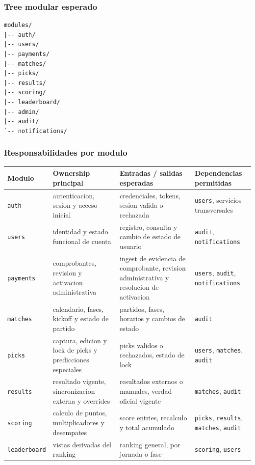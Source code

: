 \subsubsection{Tree modular esperado}

\begin{verbatim}
modules/
|-- auth/
|-- users/
|-- payments/
|-- matches/
|-- picks/
|-- results/
|-- scoring/
|-- leaderboard/
|-- admin/
|-- audit/
`-- notifications/
\end{verbatim}

\subsubsection{Responsabilidades por modulo}

\begin{longtable}{p{}p{}p{}p{}}
\toprule
\textbf{Modulo} & \textbf{Ownership principal} & \textbf{Entradas / salidas esperadas} & \textbf{Dependencias permitidas} \\
\midrule
\texttt{auth} & autenticacion, sesion y acceso inicial & credenciales, tokens, sesion valida o rechazada & \texttt{users}, servicios transversales \\
\texttt{users} & identidad y estado funcional de cuenta & registro, consulta y cambio de estado de usuario & \texttt{audit}, \texttt{notifications} \\
\texttt{payments} & comprobantes, revision y activacion administrativa & ingest de evidencia de comprobante, revision administrativa y resolucion de activacion & \texttt{users}, \texttt{audit}, \texttt{notifications} \\
\texttt{matches} & calendario, fases, kickoff y estado de partido & partidos, fases, horarios y cambios de estado & \texttt{audit} \\
\texttt{picks} & captura, edicion y lock de picks y predicciones especiales & picks validos o rechazados, estado de lock & \texttt{users}, \texttt{matches}, \texttt{audit} \\
\texttt{results} & resultado vigente, sincronizacion externa y overrides & resultados externos o manuales, verdad oficial vigente & \texttt{matches}, \texttt{audit} \\
\texttt{scoring} & calculo de puntos, multiplicadores y desempates & score entries, recalculo y total acumulado & \texttt{picks}, \texttt{results}, \texttt{matches}, \texttt{audit} \\
\texttt{leaderboard} & vistas derivadas del ranking & ranking general, por jornada o fase & \texttt{scoring}, \texttt{users} \\

\end{longtable}
